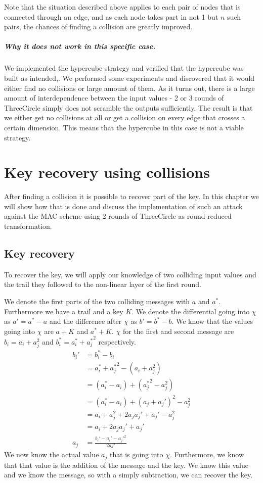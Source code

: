 \documentclass{report}
\newcommand{\ThreeCircle}{{\sc ThreeCircle} }
\begin{document}
Note that the situation described above applies to each pair of nodes that is connected through an edge, and as each node takes part in not 1 but $n$ such pairs, the chances of finding a collision are greatly improved.

\paragraph{Why it does not work in this specific case.}
We implemented the hypercube strategy and verified that the hypercube was built as intended,.
We performed some experiments and discovered that it would either find no collisions or large amount of them. As it turns out, there is a large amount of interdependence between the input values - 2 or 3 rounds of \ThreeCircle simply does not scramble the outputs sufficiently. The result is that we either get no collisions at all or get a collision on every edge that crosses a certain dimension. This means that the hypercube in this case is not a viable strategy.

\chapter{Key recovery using collisions}
After finding a collision it is possible to recover part of the key. In this chapter we will show how that is done and discuss the implementation of such an attack against the MAC scheme using 2 rounds of \ThreeCircle as round-reduced transformation.

\section{Key recovery}
To recover the key, we will apply our knowledge of two colliding input values and the trail they followed to the non-linear layer of the first round.

We denote the first parts of the two colliding messages with $a$ and $a^*$. Furthermore we have a trail and a key $K$. We denote the differential going into $\chi$ as $a' = a^* - a$ and the difference after $\chi$ as $b' = b^* - b$. We know that the values going into $\chi$ are $a + K$ and $a^* + K$. $\chi$ for the first and second message are $b_i = a_i + a_j^2$ and $b_i^* = a_i^* + {a_j^*}^2$ respectively.
\begin{equation}
\begin{split}
b_i' &= b_i^* - b_i \\
&= a_i^* + {a_j^*}^2 - (a_i + a_j^2) \\
&= (a_i^* - a_i) + ({a_j^*}^2 - a_j^2) \\
&= (a_i^* - a_i) + (a_j + a_j')^2 - a_j^2 \\
&= a_i + a_j^2 + 2a_ja_j' + a_j' - a_j^2 \\
&= a_i  + 2a_ja_j' + a_j' \\
a_j &= \frac{b_i' - a_i' -a_j'^2}{2aj'}
\end{split}
\label{eq:recover}
\end{equation}
We now know the actual value $a_j$ that is going into $\chi$. Furthermore, we know that that value is the addition of the message and the key. We know this value and we know the message, so with a simply subtraction, we can recover the key.
\end{document}
